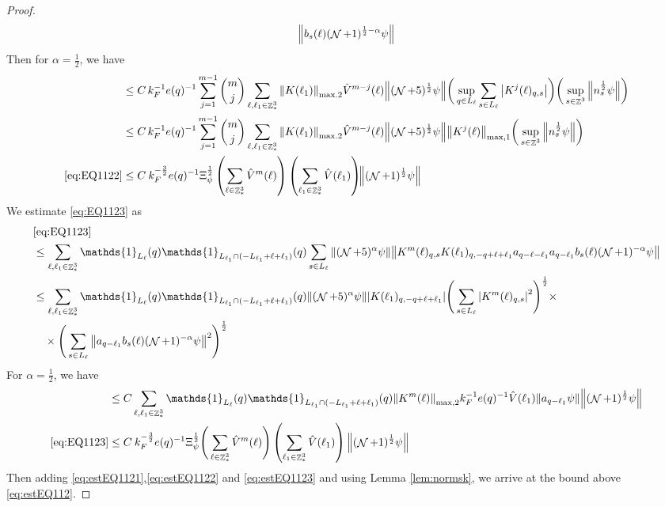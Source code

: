 \documentclass[sn-mathphys, Numbered ,a4paper]{sn-jnl}%
\DeclareMathOperator{\Z}{\mathbb{Z}}
\DeclareMathOperator{\NN}{\mathcal{N}}
\newcommand{\half}{\frac{1}{2}}
\theoremstyle{plain}
\theoremstyle{definition}
\theoremstyle{remark}
\theoremstyle{plain}
\theoremstyle{definition}
\theoremstyle{remark}
\begin{document}
\begin{proof}
\begin{alignat}{2}
		\norm{  b_{s}(\ell)  (\NN+1)^{\half-\alpha} \psi }		
	\nonumber\\
\end{alignat}
Then for $\alpha = \half$, we have
\begin{align}
	&\leq  C\,k_F^{-1}e(q)^{-1}\sum\limits_{j=1}^{m-1} {{m}\choose j}\sum\limits_{\ell, \ell_1\in \Z^3_*}  \norm{K(\ell_1)}_{\mathrm{max.2}} \hat{V}^{m-j}(\ell) \norm{ (\NN+5)^{\half} \psi} \bigg(\sup_{q \in L_{\ell}}\sum\limits_{s\in L_{\ell}}\abs{K^{j}(\ell)_{q,s}}\bigg) \bigg(
	\sup_{s \in \Z^3}\norm{  n_s^\half   \psi } \bigg)\nonumber\\
	&\leq  C\,k_F^{-1}e(q)^{-1}\sum\limits_{j=1}^{m-1} {{m}\choose j}\sum\limits_{\ell, \ell_1\in \Z^3_*}  \norm{K(\ell_1)}_{\mathrm{max.2}} \hat{V}^{m-j}(\ell) \norm{ (\NN+5)^{\half} \psi} \norm{K^j(\ell)}_{\mathrm{max,1}} \bigg(
	\sup_{s \in \Z^3}\norm{  n_s^\half   \psi } \bigg)\nonumber\\
	\eqref{eq:EQ1122}&\leq C \: k_F^{-\frac{3}{2}}e(q)^{-1} \Xi_{\psi}^\half \left( \sum\limits_{\ell \in \Z^3_*} \hat{V}^{m}(\ell)\right) \left( \sum\limits_{ \ell_1\in \Z^3_*}\hat{V}(\ell_1) \right)\!\! \norm{(\NN+1)^\half \psi } \label{eq:estEQ1122}
\end{align}
We estimate \eqref{eq:EQ1123} as 
\begin{align}
	&\eqref{eq:EQ1123}\nonumber\\
	&\leq\sum\limits_{\ell, \ell_1\in \Z^3_*} \mathds{1}_{L_{\ell}}(q) \mathds{1}_{L_{\ell_1}\cap(-L_{\ell_1}+\ell+\ell_1)}(q) \sum\limits_{s \in L_{\ell}} \norm{(\NN+5)^{\alpha} \psi}\norm{ K^m(\ell)_{q,s} K(\ell_1)_{q,-q+\ell+\ell_1} a_{q-\ell-\ell_1} a_{q-\ell_1} b_{s}(\ell) (\NN+1)^{-\alpha} \psi }\nonumber\nonumber\\
	&\leq\sum\limits_{\ell, \ell_1\in \Z^3_*} \mathds{1}_{L_{\ell}}(q) \mathds{1}_{L_{\ell_1}\cap(-L_{\ell_1}+\ell+\ell_1)}(q)\norm{(\NN+5)^{\alpha} \psi} \abs{K(\ell_1)_{q,-q+\ell+\ell_1}} \Bigg( \sum\limits_{s \in L_{\ell}} \abs{K^m(\ell)_{q,s}}^2\Bigg)^\half \times \nonumber\\ &\quad \times \Bigg(\sum\limits_{s \in L_{\ell}} \norm{ a_{q-\ell_1} b_s(\ell) (\NN+1)^{-\alpha} \psi  }^2\Bigg)^\half \nonumber\\
\end{align}
For $\alpha=\half$, we have
\begin{align}
	&\leq C\sum\limits_{\ell, \ell_1\in \Z^3_*} \mathds{1}_{L_{\ell}}(q) \mathds{1}_{L_{\ell_1}\cap(-L_{\ell_1}+\ell+\ell_1)}(q) \norm{K^m(\ell)}_{\mathrm{max,2}} k_F^{-1}e(q)^{-1}\hat{V}(\ell_1) \norm{a_{q-\ell_1} \psi } \norm{(\NN+1)^\half \psi}\nonumber\\
	\eqref{eq:EQ1123}&\leq C\: k_F^{-\frac{3}{2}}e(q)^{-1}\Xi_{\psi}^\half   \Bigg( \sum\limits_{\ell\in \Z^3_*} \hat{V}^{m}(\ell)\Bigg) \left(\sum\limits_{ \ell_1\in \Z^3_*} \hat{V}(\ell_1) \right)  \norm{(\NN+1)^\half \psi}\label{eq:estEQ1123}
\end{align}
Then adding \eqref{eq:estEQ1121},\eqref{eq:estEQ1122} and \eqref{eq:estEQ1123} and using Lemma \ref{lem:normsk}, we arrive at the bound above \eqref{eq:estEQ112}.
\end{proof}
\end{document}
